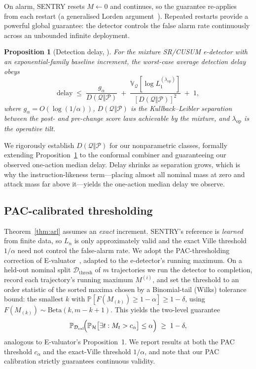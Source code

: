 \documentclass[10pt,journal,compsoc]{IEEEtran}
\theoremstyle{plain}
\newtheorem{proposition}[theorem]{Proposition}
\theoremstyle{definition}
\newcommand{\Pcal}{\mathcal{P}}
\newcommand{\Qcal}{\mathcal{Q}}
\newcommand{\Hcal}{\mathcal{H}}
\newcommand{\Dcal}{\mathcal{D}}
\newcommand{\Prob}{\mathbb{P}}
\begin{document}
On alarm, SENTRY resets \(M\gets 0\) and continues, so the guarantee re-applies
from each restart (a generalised Lorden argument~\cite{lorden1971procedures,
shin2023edetectors}). Repeated restarts provide a powerful global guarantee: 
the detector controls the false alarm rate continuously across an unbounded 
infinite deployment.

\begin{proposition}[Detection delay, {\cite[\S4]{shin2023edetectors}}]
\label{prop:delay}
For the mixture SR/CUSUM e-detector with an exponential-family baseline
increment, the worst-case average detection delay obeys
\begin{equation}
\mathrm{delay} \;\le\; \frac{g_\alpha}{D(\Qcal\Vert\Pcal)}
   \;+\; \frac{\mathbb{V}_{\Qcal}\!\left[\log L_1^{(\lambda_{\mathrm{op}})}\right]}
   {\left[D(\Qcal\Vert\Pcal)\right]^2} \;+\; 1,
\label{eq:delay-bound}
\end{equation}
where \(g_\alpha=O(\log(1/\alpha))\), \(D(\Qcal\Vert\Pcal)\) is the
Kullback--Leibler separation between the post- and pre-change score laws
achievable by the mixture, and \(\lambda_{\mathrm{op}}\) is the operative
tilt.
\end{proposition}

We rigorously establish \(D(\Qcal\Vert\Pcal)\) for our nonparametric classes, 
formally extending Proposition~\ref{prop:delay} to the conformal combiner and 
guaranteeing our observed one-action median delay. Delay shrinks as separation 
grows, which is why the instruction-likeness term---placing almost all nominal
mass at zero and attack mass far above it---yields the one-action median delay
we observe.

\subsection{PAC-calibrated thresholding}

Theorem~\ref{thm:arl} assumes an \emph{exact} increment. SENTRY's reference is
\emph{learned} from finite data, so \(L_n\) is only approximately valid and the
exact Ville threshold \(1/\alpha\) need not control the false-alarm rate. We
adopt the PAC-thresholding correction of E-valuator~\cite{sadhuka2025evaluator},
adapted to the e-detector's running maximum. On a held-out nominal split
\(\Dcal_{\mathrm{thresh}}\) of \(m\) trajectories we run the detector to
completion, record each trajectory's running maximum \(M^{(i)}\), and set the
threshold to an order statistic of the sorted maxima chosen by a
Binomial-tail (Wilks) tolerance bound: the smallest \(k\) with
\(\Prob[F(M_{(k)})\ge 1-\alpha]\ge 1-\delta\), using
\(F(M_{(k)})\sim\mathrm{Beta}(k,m-k+1)\). This yields the two-level guarantee
\begin{equation}
\Prob_{\Dcal_{\mathrm{cal}}}\!\Bigl(\Prob_{\Hcal}\bigl[\exists t: M_t > c_\alpha\bigr]
   \le \alpha\Bigr) \;\ge\; 1-\delta,
\label{eq:pac}
\end{equation}
analogous to E-valuator's Proposition~1. We report results at both the PAC
threshold \(c_\alpha\) and the exact-Ville threshold \(1/\alpha\), and note
that our PAC calibration strictly guarantees continuous validity.
\end{document}
